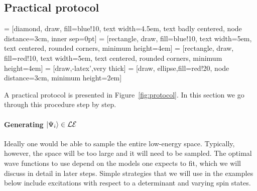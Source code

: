 \subsection{Practical protocol}

 = [diamond, draw, fill=blue!10, 
    text width=4.5em, text badly centered, node distance=3cm, inner sep=0pt]
 = [rectangle, draw, fill=blue!10, 
    text width=5em, text centered, rounded corners, minimum height=4em]
 = [rectangle, draw, fill=red!10, 
    text width=5em, text centered, rounded corners, minimum height=4em]
 = [draw,-latex',very thick]
 = [draw, ellipse,fill=red!20, node distance=3cm,
    minimum height=2em]
\begin{figure*}[hbt]
\caption{A practical protocol for fitting effective models to {\it ab initio} data.}
\label{fig:protocol} 
\end{figure*}

A practical protocol is presented in Figure~\ref{fig:protocol}. 
In this section we go through this procedure step by step.

\paragraph{Generating $\ket{\Psi_i}\in \mathcal{LE}$}
Ideally one would be able to sample the entire low-energy space. 
Typically, however, the space will be too large and it will need to be sampled. 
The optimal wave functions to use depend on the models one expects to fit, which we will discuss in detail  in later steps. 
Simple strategies that we will use in the examples below include excitations with respect to a determinant and varying spin states.


